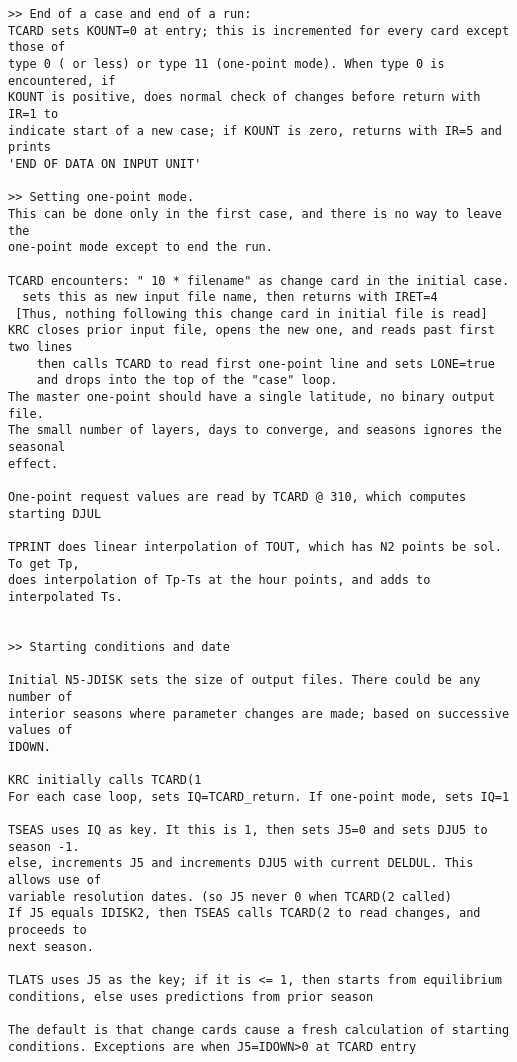 \begin{verbatim}
>> End of a case and end of a run:
TCARD sets KOUNT=0 at entry; this is incremented for every card except those of
type 0 ( or less) or type 11 (one-point mode). When type 0 is encountered, if
KOUNT is positive, does normal check of changes before return with IR=1 to
indicate start of a new case; if KOUNT is zero, returns with IR=5 and prints
'END OF DATA ON INPUT UNIT'

>> Setting one-point mode.
This can be done only in the first case, and there is no way to leave the 
one-point mode except to end the run.

TCARD encounters: " 10 * filename" as change card in the initial case.
  sets this as new input file name, then returns with IRET=4 
 [Thus, nothing following this change card in initial file is read]
KRC closes prior input file, opens the new one, and reads past first two lines 
    then calls TCARD to read first one-point line and sets LONE=true
    and drops into the top of the "case" loop. 
The master one-point should have a single latitude, no binary output file.
The small number of layers, days to converge, and seasons ignores the seasonal 
effect.

One-point request values are read by TCARD @ 310, which computes starting DJUL

TPRINT does linear interpolation of TOUT, which has N2 points be sol. To get Tp,
does interpolation of Tp-Ts at the hour points, and adds to interpolated Ts.
 

>> Starting conditions and date

Initial N5-JDISK sets the size of output files. There could be any number of
interior seasons where parameter changes are made; based on successive values of
IDOWN.

KRC initially calls TCARD(1
For each case loop, sets IQ=TCARD_return. If one-point mode, sets IQ=1

TSEAS uses IQ as key. It this is 1, then sets J5=0 and sets DJU5 to season -1.
else, increments J5 and increments DJU5 with current DELDUL. This allows use of
variable resolution dates. (so J5 never 0 when TCARD(2 called)
If J5 equals IDISK2, then TSEAS calls TCARD(2 to read changes, and proceeds to 
next season. 

TLATS uses J5 as the key; if it is <= 1, then starts from equilibrium
conditions, else uses predictions from prior season

The default is that change cards cause a fresh calculation of starting
conditions. Exceptions are when J5=IDOWN>0 at TCARD entry


\end{verbatim}

